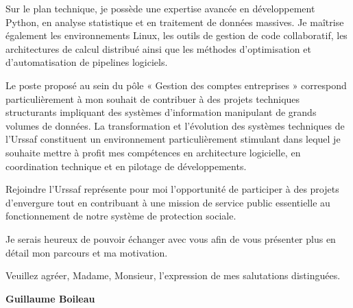 \documentclass[11pt,a4paper]{altacv}
\begin{document}
{Sur le plan technique, je possède une expertise avancée en développement Python, en analyse statistique et en traitement de données massives. Je maîtrise également les environnements Linux, les outils de gestion de code collaboratif, les architectures de calcul distribué ainsi que les méthodes d’optimisation et d’automatisation de pipelines logiciels.

Le poste proposé au sein du pôle « Gestion des comptes entreprises » correspond particulièrement à mon souhait de contribuer à des projets techniques structurants impliquant des systèmes d’information manipulant de grands volumes de données. La transformation et l’évolution des systèmes techniques de l’Urssaf constituent un environnement particulièrement stimulant dans lequel je souhaite mettre à profit mes compétences en architecture logicielle, en coordination technique et en pilotage de développements.

Rejoindre l’Urssaf représente pour moi l’opportunité de participer à des projets d’envergure tout en contribuant à une mission de service public essentielle au fonctionnement de notre système de protection sociale.

Je serais heureux de pouvoir échanger avec vous afin de vous présenter plus en détail mon parcours et ma motivation.

Veuillez agréer, Madame, Monsieur, l’expression de mes salutations distinguées.

\textbf{Guillaume Boileau}

}
\end{document}
